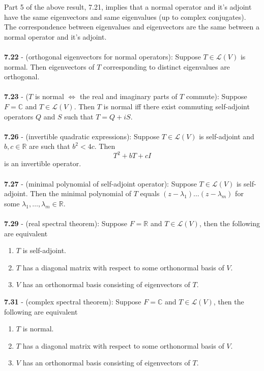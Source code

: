 \documentclass{article}
\theoremstyle{definition}
\begin{document}
Part 5 of the above result, 7.21, implies that a normal operator and it's adjoint have the same eigenvectors and same eigenvalues (up to complex conjugates). The correspondence between eigenvalues and eigenvectors are the same between a normal operator and it's adjoint. \\ \\
\textbf{7.22} - (orthogonal eigenvectors for normal operators): Suppose $T \in \mathcal{L}(V)$ is normal. Then eigenvectors of $T$ corresponding to distinct eigenvalues are orthogonal.  \\ \\
\textbf{7.23} - ($T$ is normal $\iff$ the real and imaginary parts of $T$ commute): Suppose $F = \mathbb{C}$ and $T \in \mathcal{L}(V)$. Then $T$ is normal iff there exist commuting self-adjoint operators $Q$ and $S$ such that $T = Q + iS$. \\ \\
\textbf{7.26} - (invertible quadratic expressions): Suppose $T \in \mathcal{L}(V)$ is self-adjoint and $b, c \in \mathbb{R}$ are such that $b^2 < 4c$. Then $$T^2 + bT + cI$$ is an invertible operator. \\ \\
\textbf{7.27} - (minimal polynomial of self-adjoint operator): Suppose $T \in \mathcal{L}(V)$ is self-adjoint. Then the minimal polynomial of $T$ equals $(z - \lambda_1)\dots(z - \lambda_m)$ for some $\lambda_1, \dots, \lambda_m \in \mathbb{R}$. \\ \\
\textbf{7.29} - (real spectral theorem): Suppose $F = \mathbb{R}$ and $T \in \mathcal{L}(V)$, then the following are equivalent \begin{enumerate}
    \item $T$ is self-adjoint.
    \item $T$ has a diagonal matrix with respect to some orthonormal basis of $V$.
    \item $V$ has an orthonormal basis consisting of eigenvectors of $T$.
\end{enumerate} $ $ \\
\textbf{7.31} - (complex spectral theorem): Suppose $F = \mathbb{C}$ and $T \in \mathcal{L}(V)$, then the following are equivalent \begin{enumerate}
    \item $T$ is normal.
    \item $T$ has a diagonal matrix with respect to some orthonormal basis of $V$.
    \item $V$ has an orthonormal basis consisting of eigenvectors of $T$.
\end{enumerate} $ $ \\
\end{document}
